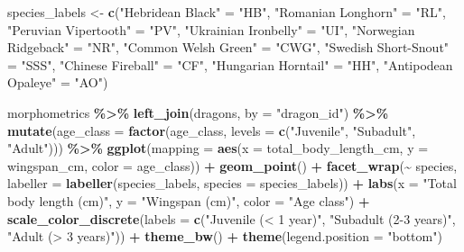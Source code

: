 \documentclass[
]{book}
\newenvironment{Shaded}{\begin{snugshade}}{\end{snugshade}}
\newcommand{\AttributeTok}[1]{\textcolor[rgb]{0.13,0.29,0.53}{#1}}
\newcommand{\FunctionTok}[1]{\textcolor[rgb]{0.13,0.29,0.53}{\textbf{#1}}}
\newcommand{\NormalTok}[1]{#1}
\newcommand{\OtherTok}[1]{\textcolor[rgb]{0.56,0.35,0.01}{#1}}
\newcommand{\SpecialCharTok}[1]{\textcolor[rgb]{0.81,0.36,0.00}{\textbf{#1}}}
\newcommand{\StringTok}[1]{\textcolor[rgb]{0.31,0.60,0.02}{#1}}
\begin{document}
\begin{Shaded}
\begin{Highlighting}[]
\NormalTok{species\_labels }\OtherTok{\textless{}{-}} \FunctionTok{c}\NormalTok{(}\StringTok{"Hebridean Black"} \OtherTok{=} \StringTok{"HB"}\NormalTok{,}
                    \StringTok{"Romanian Longhorn"} \OtherTok{=} \StringTok{"RL"}\NormalTok{,}
                    \StringTok{"Peruvian Vipertooth"} \OtherTok{=} \StringTok{"PV"}\NormalTok{,}
                    \StringTok{"Ukrainian Ironbelly"} \OtherTok{=} \StringTok{"UI"}\NormalTok{,}
                    \StringTok{"Norwegian Ridgeback"} \OtherTok{=} \StringTok{"NR"}\NormalTok{,}
                    \StringTok{"Common Welsh Green"} \OtherTok{=} \StringTok{"CWG"}\NormalTok{,}
                    \StringTok{"Swedish Short{-}Snout"} \OtherTok{=} \StringTok{"SSS"}\NormalTok{,}
                    \StringTok{"Chinese Fireball"} \OtherTok{=} \StringTok{"CF"}\NormalTok{,}
                    \StringTok{"Hungarian Horntail"} \OtherTok{=} \StringTok{"HH"}\NormalTok{,}
                    \StringTok{"Antipodean Opaleye"} \OtherTok{=} \StringTok{"AO"}\NormalTok{)}
  
\NormalTok{morphometrics }\SpecialCharTok{\%\textgreater{}\%} 
  \FunctionTok{left\_join}\NormalTok{(dragons, }\AttributeTok{by =} \StringTok{"dragon\_id"}\NormalTok{) }\SpecialCharTok{\%\textgreater{}\%} 
  \FunctionTok{mutate}\NormalTok{(}\AttributeTok{age\_class =} \FunctionTok{factor}\NormalTok{(age\_class, }\AttributeTok{levels =} \FunctionTok{c}\NormalTok{(}\StringTok{"Juvenile"}\NormalTok{,}
                                                  \StringTok{"Subadult"}\NormalTok{,}
                                                  \StringTok{"Adult"}\NormalTok{))) }\SpecialCharTok{\%\textgreater{}\%} 
\FunctionTok{ggplot}\NormalTok{(}\AttributeTok{mapping =} \FunctionTok{aes}\NormalTok{(}\AttributeTok{x =}\NormalTok{ total\_body\_length\_cm, }\AttributeTok{y =}\NormalTok{ wingspan\_cm, }\AttributeTok{color =}\NormalTok{ age\_class)) }\SpecialCharTok{+}
  \FunctionTok{geom\_point}\NormalTok{() }\SpecialCharTok{+}
  \FunctionTok{facet\_wrap}\NormalTok{(}\SpecialCharTok{\textasciitilde{}}\NormalTok{ species, }\AttributeTok{labeller =} \FunctionTok{labeller}\NormalTok{(species\_labels, }
                                            \AttributeTok{species =}\NormalTok{ species\_labels)) }\SpecialCharTok{+}
  \FunctionTok{labs}\NormalTok{(}\AttributeTok{x =} \StringTok{"Total body length (cm)"}\NormalTok{, }\AttributeTok{y =} \StringTok{"Wingspan (cm)"}\NormalTok{, }\AttributeTok{color =} \StringTok{"Age class"}\NormalTok{) }\SpecialCharTok{+}
  \FunctionTok{scale\_color\_discrete}\NormalTok{(}\AttributeTok{labels =} \FunctionTok{c}\NormalTok{(}\StringTok{"Juvenile (\textless{} 1 year)"}\NormalTok{,}
                                 \StringTok{"Subadult (2{-}3 years)"}\NormalTok{,}
                                 \StringTok{"Adult (\textgreater{} 3 years)"}\NormalTok{)) }\SpecialCharTok{+}
  \FunctionTok{theme\_bw}\NormalTok{() }\SpecialCharTok{+}
  \FunctionTok{theme}\NormalTok{(}\AttributeTok{legend.position =} \StringTok{"bottom"}\NormalTok{) }
\end{Highlighting}
\end{Shaded}
\end{document}
